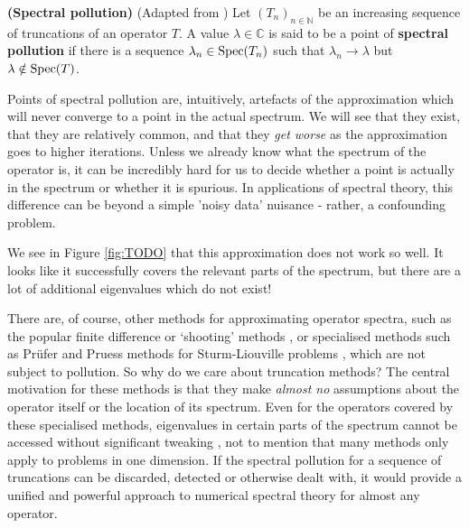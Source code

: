 \documentclass[../main.tex]{subfiles}
\begin{document}
\begin{definition}{\textbf{(Spectral pollution)}}
(Adapted from \parencite{davies1995spectral})
Let $(T_n)_{n \in \mathbb{N}}$ be an increasing sequence of truncations of an operator $T$. A value $\lambda \in \mathbb{C}$ is said to be a point of \textbf{spectral pollution} if there is a sequence $\lambda_n \in \mathrm{Spec}(T_n)$ such that $\lambda_n \rightarrow \lambda$ but $\lambda \notin \mathrm{Spec}(T)$.
\end{definition}

Points of spectral pollution are, intuitively, artefacts of the approximation which will never converge to a point in the actual spectrum. We will see that they exist, that they are relatively common, and that they \emph{get worse} as the approximation goes to higher iterations. Unless we already
know what the spectrum of the operator is, it can be incredibly hard for us to decide whether a point is actually in the spectrum or whether it is
spurious. In applications of spectral theory, this difference can be beyond a simple 'noisy data' nuisance - rather, a confounding problem.

\begin{example}
\end{example}

We see in Figure \ref{fig:TODO} that this approximation does not work so well. It looks like it successfully covers the relevant parts of the spectrum,
but there are a lot of additional eigenvalues which do not exist!

There are, of course, other methods for approximating operator spectra, such as the popular finite difference or `shooting' methods \cite{suli2003introduction}, or specialised methods such as Pr\"ufer and Pruess methods for Sturm-Liouville problems \cite{pryce1993numerical}, which are not subject to pollution. So why do we
care about truncation methods?
The central motivation for these methods is that they make \emph{almost no} assumptions about the operator itself or the location of its spectrum. Even for the operators covered by these specialised methods, eigenvalues in certain parts of the spectrum cannot be accessed without significant tweaking \cite{aceto2006numerical}, not to mention that many methods only apply to problems in one dimension.
If the spectral pollution for a sequence of truncations can be discarded, detected or otherwise dealt with, it would provide a unified and 
powerful approach to numerical spectral theory for almost any operator.
\end{document}
